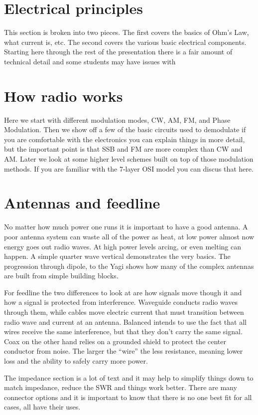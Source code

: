 \documentclass[12pt,letterpaper]{report}
\begin{document}
\section*{Electrical principles}
This section is broken into two pieces. The first covers the basics of Ohm's Law, what current is, etc. The second covers the various basic electrical components. Starting here through the rest of the presentation there is a fair amount of technical detail and some students may have issues with 

\section*{How radio works}
Here we start with different modulation modes, CW, AM, FM, and Phase Modulation. Then we show off a few of the basic circuits used to demodulate if you are comfortable with the electronics you can explain things in more detail, but the important point is that SSB and FM are more complex than CW and AM. Later we look at some higher level schemes built on top of those modulation methods. If you are familiar with the 7-layer OSI model you can discus that here.

\section*{Antennas and feedline}
No matter how much power one runs it is important to have a good antenna. A poor antenna system can waste all of the power as heat, at low power almost now energy goes out radio waves. At high power levels arcing, or even melting can happen. A simple quarter wave vertical demonstrates the very basics. The progression through dipole, to the Yagi shows how many of the complex antennas are built from simple building blocks. 

For feedline the two differences to look at are how signals move though it and how a signal is protected from interference. Waveguide conducts radio waves through them, while cables move electric current that must transition between radio wave and current at an antenna. Balanced intends to use the fact that all wires receive the same interference, but that they don't carry the same signal. Coax on the other hand relies on a grounded shield to protect the center conductor from noise. The larger the ``wire'' the less resistance, meaning lower loss and the ability to safely carry more power.

The impedance section is a lot of text and it may help to simplify things down to match impedance, reduce the SWR and things work better. There are many connector options and it is important to know that there is no one best fit for all cases, all have their uses. 
\end{document}
